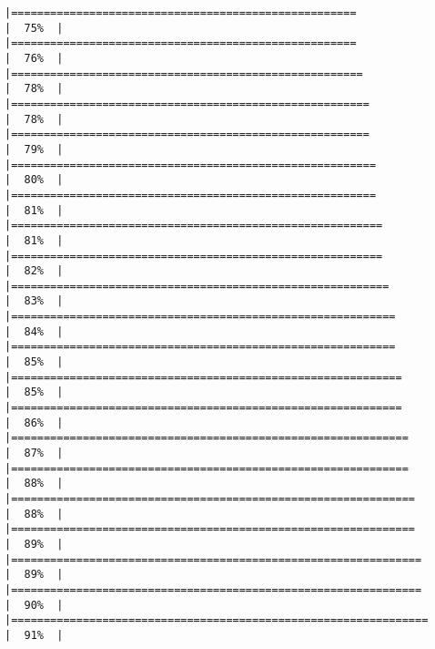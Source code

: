 \documentclass[
]{article}
\begin{document}
\begin{verbatim}
|=====================================================                 |  75%  |                                                                              |=====================================================                 |  76%  |                                                                              |======================================================                |  78%  |                                                                              |=======================================================               |  78%  |                                                                              |=======================================================               |  79%  |                                                                              |========================================================              |  80%  |                                                                              |========================================================              |  81%  |                                                                              |=========================================================             |  81%  |                                                                              |=========================================================             |  82%  |                                                                              |==========================================================            |  83%  |                                                                              |===========================================================           |  84%  |                                                                              |===========================================================           |  85%  |                                                                              |============================================================          |  85%  |                                                                              |============================================================          |  86%  |                                                                              |=============================================================         |  87%  |                                                                              |=============================================================         |  88%  |                                                                              |==============================================================        |  88%  |                                                                              |==============================================================        |  89%  |                                                                              |===============================================================       |  89%  |                                                                              |===============================================================       |  90%  |                                                                              |================================================================      |  91%  |                                                                              
\end{verbatim}
\end{document}
